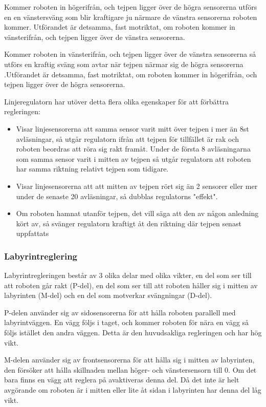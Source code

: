 Kommer roboten in högerifrån, och tejpen ligger över de högra sensorerna 
utförs en en vänstersväng som blir kraftigare ju närmare de vänstra 
sensorerna roboten kommer. Utförandet är detsamma, fast motriktat, om roboten 
kommer in vänsterifrån, och tejpen ligger över de vänstra sensorerna.

Kommer roboten in vänsterifrån, och tejpen ligger över de vänstra sensorerna 
så utförs en kraftig sväng som avtar när tejpen närmar sig de högra sensorerna
.Utförandet är detsamma, fast motriktat, om roboten kommer in högerifrån, och 
tejpen ligger över de högra sensorerna.


Linjeregulatorn har utöver detta flera olika egenskaper för att förbättra 
regleringen:
\begin{itemize}
\item Visar linjesensorerna att samma sensor varit mitt över tejpen i mer än 8st 
avläsningar, så utgår regulatorn ifrån att tejpen för tillfället är rak och roboten 
beordras att röra sig rakt framåt. Under de första 8 avläsningarna som samma 
sensor varit i mitten av tejpen så utgår regulatorn att roboten har samma riktning 
relativt tejpen som tidigare.
\item Visar linjesensorerna att att mitten av tejpen rört sig än 2 sensorer eller mer
 under de senaste 20 avläsningar, så dubblas regulatorns "effekt".
\item Om roboten hamnat utanför tejpen, det vill säga att den av någon anledning 
kört av, så svänger regulatorn kraftigt åt den riktning där tejpen senast uppfattats
\end{itemize}



\subsubsection{Labyrintreglering}
\label{sec:labyrintreglering}
Labyrintregleringen består av 3 olika delar med olika vikter,
en del som ser till att roboten går rakt (P-del), en del som ser till att
roboten håller sig i mitten av labyrinten (M-del) och en del som motverkar
svängningar (D-del).


P-delen använder sig av sidosensorerna för att hålla roboten parallell med
labyrintväggen. En vägg följs i taget, och kommer roboten för nära en vägg så
följs istället den andra väggen. Detta är den huvudsakliga regleringen och har
hög vikt.


M-delen använder sig av frontsensorerna för att hålla sig i mitten av
labyrinten, den försöker att hålla skillnaden mellan höger- och vänstersensorn
till 0. Om det bara finns en vägg att reglera på avaktiveras denna del. Då det
inte är helt avgörande om roboten är i mitten eller lite åt sidan i labyrinten
har denna del låg vikt.


